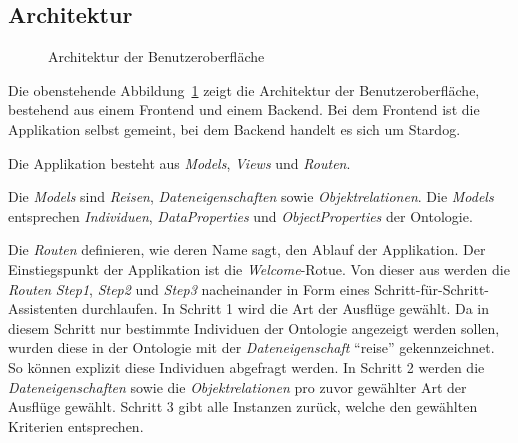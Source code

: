 \subsection{Architektur}
\label{subsec:komponenten:gui:architektur}
\begin{figure}[H]
    \centering {}
    \caption{Architektur der Benutzeroberfläche\label{fig:architektur:gui}\protect\footnotemark}
\end{figure}

Die obenstehende Abbildung~\ref{fig:architektur:gui} zeigt die Architektur der Benutzeroberfläche, bestehend aus einem Frontend und einem Backend. Bei dem Frontend ist die Applikation selbst gemeint, bei dem Backend handelt es sich um Stardog.

Die Applikation besteht aus \textit{Models}, \textit{Views} und \textit{Routen}.

Die \textit{Models} sind \textit{Reisen}, \textit{Dateneigenschaften} sowie \textit{Objektrelationen}. Die \textit{Models} entsprechen \textit{Individuen}, \textit{DataProperties} und \textit{ObjectProperties} der Ontologie.

Die \textit{Routen} definieren, wie deren Name sagt, den Ablauf der Applikation. Der Einstiegspunkt der Applikation ist die \textit{Welcome}-Rotue. Von dieser aus werden die \textit{Routen} \textit{Step1}, \textit{Step2} und \textit{Step3} nacheinander in Form eines Schritt-für-Schritt-Assistenten durchlaufen. In Schritt 1 wird die Art der Ausflüge gewählt. Da in diesem Schritt nur bestimmte Individuen der Ontologie angezeigt werden sollen, wurden diese in der Ontologie mit der \textit{Dateneigenschaft} ``reise'' gekennzeichnet. So können explizit diese Individuen abgefragt werden. In Schritt 2 werden die \textit{Dateneigenschaften} sowie die \textit{Objektrelationen} pro zuvor gewählter Art der Ausflüge gewählt. Schritt 3 gibt alle Instanzen zurück, welche den gewählten Kriterien entsprechen.

